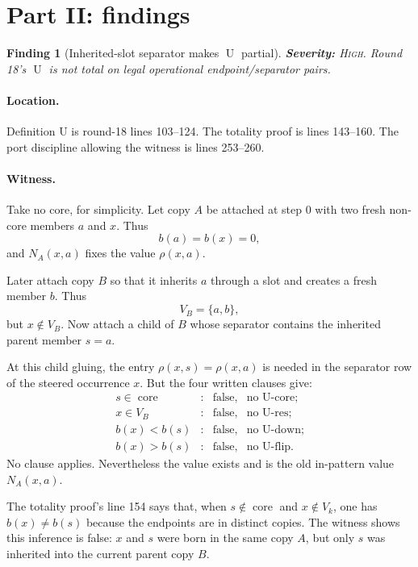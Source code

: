 \documentclass[11pt]{article}
\newcommand{\core}{\operatorname{core}}
\newcommand{\Uop}{\operatorname{U}}
\newcommand{\sev}[1]{\textsc{#1}}
\newcommand{\rhoR}{\rho}
\newtheorem{finding}{Finding}
\theoremstyle{remark}
\begin{document}
\section{Part II: findings}

\begin{finding}[Inherited-slot separator makes $\Uop$ partial]
\label{find:inherited-cobirth}
\textbf{Severity:} \sev{High}.  Round 18's $\Uop$ is not total on legal operational endpoint/separator pairs.
\end{finding}

\paragraph{Location.}
Definition U is round-18 lines 103--124.  The totality proof is lines 143--160.  The port discipline allowing the witness is lines 253--260.

\paragraph{Witness.}
Take no core, for simplicity.  Let copy $A$ be attached at step $0$ with two fresh non-core members $a$ and $x$.  Thus
\[
  b(a)=b(x)=0,
\]
and $N_A(x,a)$ fixes the value $\rhoR(x,a)$.

Later attach copy $B$ so that it inherits $a$ through a slot and creates a fresh member $b$.  Thus
\[
  V_B=\{a,b\},
\]
but $x\notin V_B$.  Now attach a child of $B$ whose separator contains the inherited parent member $s=a$.

At this child gluing, the entry $\rhoR(x,s)=\rhoR(x,a)$ is needed in the separator row of the steered occurrence $x$.  But the four written clauses give:
\[
\begin{array}{rcll}
  s\in\core      &:& \text{false}, & \text{no U-core;}\\
  x\in V_B       &:& \text{false}, & \text{no U-res;}\\
  b(x)<b(s)      &:& \text{false}, & \text{no U-down;}\\
  b(x)>b(s)      &:& \text{false}, & \text{no U-flip.}
\end{array}
\]
No clause applies.  Nevertheless the value exists and is the old in-pattern value $N_A(x,a)$.

The totality proof's line 154 says that, when $s\notin\core$ and $x\notin V_k$, one has $b(x)\ne b(s)$ because the endpoints are in distinct copies.  The witness shows this inference is false: $x$ and $s$ were born in the same copy $A$, but only $s$ was inherited into the current parent copy $B$.
\end{document}

